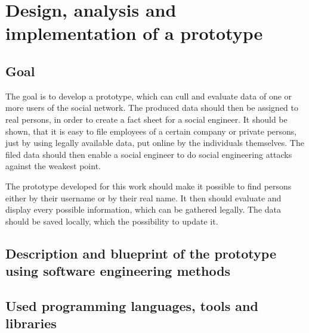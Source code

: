 \chapter{Design, analysis and implementation of a prototype}
\label{chapter:prototype}

\section{Goal}

The goal is to develop a prototype, which can cull and evaluate data of one or
more users of the \Twitter{} social network. The produced data should then be
assigned to real persons, in order to create a fact sheet for a social
engineer. It should be shown, that it is easy to file employees of a certain
company or private persons, just by using legally available data, put online by
the individuals themselves. The filed data should then enable a social
engineer to do social engineering attacks against the weakest point.

The prototype developed for this work should make it possible to find persons
either by their username or by their real name.
It then should evaluate and display every possible information, which can be
gathered legally. The data should be saved locally, which the possibility to
update it.

\section{Description and blueprint of the prototype using software engineering
methods}

\section{Used programming languages, tools and libraries}

